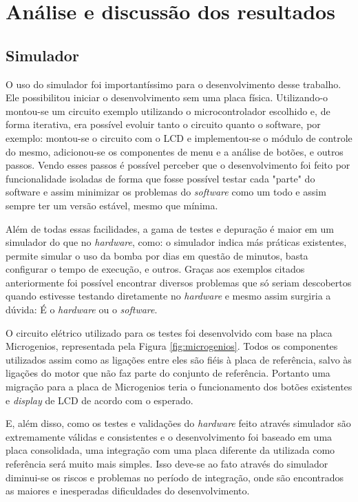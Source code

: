 \chapter{Análise e discussão dos resultados}

\section{Simulador}

O uso do simulador foi importantíssimo para o desenvolvimento desse trabalho. Ele possibilitou iniciar o desenvolvimento sem uma placa física. Utilizando-o montou-se um circuito exemplo utilizando o microcontrolador escolhido e, de forma iterativa, era possível evoluir tanto o circuito quanto o software, por exemplo: montou-se o circuito com o LCD e implementou-se o módulo de controle do mesmo, adicionou-se os componentes de menu e a análise de botões, e outros passos. Vendo esses passos é possível perceber que o desenvolvimento foi feito por funcionalidade isoladas de forma que fosse possível testar cada "parte" do software e assim minimizar os problemas do \emph{software} como um todo e assim sempre ter um versão estável, mesmo que mínima.

Além de todas essas facilidades, a gama de testes e depuração é maior em um simulador do que no \emph{hardware}, como: o simulador indica más práticas existentes, permite simular o uso da bomba por dias em questão de minutos, basta configurar o tempo de execução, e outros. Graças aos exemplos citados anteriormente foi possível encontrar diversos problemas que só seriam descobertos quando estivesse testando diretamente no \emph{hardware} e mesmo assim surgiria a dúvida: É o \emph{hardware} ou o \emph{software}.

O circuito elétrico utilizado para os testes foi desenvolvido com base na placa Microgenios, representada pela Figura \ref{fig:microgenios}. Todos os componentes utilizados assim como as ligações entre eles são fiéis à placa de referência, salvo às ligações do motor que não faz parte do conjunto de referência. Portanto uma migração para a placa de Microgenios teria o funcionamento dos botões existentes e \emph{display} de LCD de acordo com o esperado.

E, além disso, como os testes e validações do \emph{hardware} feito através simulador são extremamente válidas e consistentes e o desenvolvimento foi baseado em uma placa consolidada, uma integração com uma placa diferente da utilizada como referência será muito mais simples. Isso deve-se ao fato através do simulador diminui-se os riscos e problemas no período de integração, onde são encontrados as maiores e inesperadas dificuldades do desenvolvimento.
 
